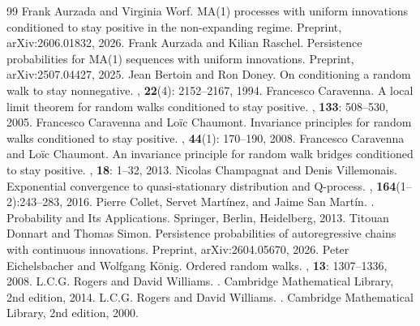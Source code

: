 \documentclass[10pt,a4paper]{amsart}
\newcommand{\1}{\mathds{1}}
\begin{document}
\begin{thebibliography}{99}
 Frank Aurzada and Virginia Worf. \newblock MA(1) processes with uniform innovations conditioned to stay positive in the non-expanding regime. \newblock Preprint, arXiv:2606.01832, 2026.
 Frank Aurzada and Kilian Raschel. \newblock Persistence probabilities for {MA}(1) sequences with uniform innovations. \newblock Preprint, arXiv:2507.04427, 2025.
 Jean Bertoin and Ron Doney. \newblock On conditioning a random walk to stay nonnegative. , {\bf 22}(4): 2152--2167, 1994.
 Francesco Caravenna. \newblock A local limit theorem for random walks conditioned to stay positive. , {\bf 133}: 508--530, 2005.
 Francesco Caravenna and Lo\"ic Chaumont. \newblock Invariance principles for random walks conditioned to stay positive. , {\bf 44}(1): 170--190, 2008.
 Francesco Caravenna and Lo\"ic Chaumont. \newblock An invariance principle for random walk bridges conditioned to stay positive. , {\bf 18}: 1--32, 2013.
 Nicolas Champagnat and Denis Villemonais. \newblock Exponential convergence to quasi-stationary distribution and {Q}-process. , {\bf 164}(1--2):243--283, 2016.
 Pierre Collet, Servet Mart{\'i}nez, and Jaime San Mart{\'i}n. . \newblock Probability and Its Applications. Springer, Berlin, Heidelberg, 2013.
 Titouan Donnart and Thomas Simon. \newblock Persistence probabilities of autoregressive chains with continuous innovations. \newblock Preprint, arXiv:2604.05670, 2026.
 Peter Eichelsbacher and Wolfgang K\"onig. \newblock Ordered random walks. , {\bf 13}: 1307--1336, 2008.
 L.C.G. Rogers and David Williams. . Cambridge Mathematical Library, 2nd edition, 2014.
 L.C.G. Rogers and David Williams. . Cambridge Mathematical Library, 2nd edition, 2000.

\end{thebibliography}
\end{document}
